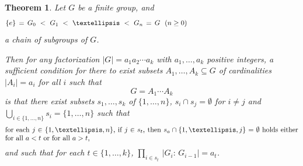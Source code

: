 \documentclass[10pt,a4paper]{amsart}
\newtheorem{theorem}{Theorem}[section]
\begin{document}
\begin{theorem}\label{thm2}
Let $G$ be a finite group, and
%
\begin{equation}\begin{minipage}[c]{35pc}\label{d.G0Gn}
$\{e\}\,=\,G_0\ <\ G_1\ <\ \dots\ <\ G_n\,=\,G$ \ $(n\geq 0)$
\end{minipage}\end{equation}
%
a chain of subgroups of $G$.

Then for any factorization $|G| = a_1 a_2 \cdots a_k$ with $a_1, \dots, a_k$ positive integers, a {\em sufficient} condition for there
to exist subsets $A_1,\dots,A_k \subseteq G$ of cardinalities $|A_i| = a_i$ for all $i$ such that $$G = A_1 \cdots A_k$$
is that there exist subsets $s_1 , \dots, s_k$ of $\{1,\dots,n\}$, $s_i \cap s_j = \emptyset$ for $i \neq j$ and $\bigcup_{i \in \{1,\dots,n\}} s_i = \{1,\dots,n\}$ such that 
%
\begin{equation*}\begin{minipage}[c]{35pc}
for each $j \in \{1,\dots,n\}$, if $j \in s_t$, then $s_a \cap \{1,\dots,j\} = \emptyset$ holds either for all $a < t$ or for all $a > t$,
\end{minipage}\end{equation*}
%
and such that for each $t \in \{1,\dots,k\}$, $\prod_{i\in s_t}\,|G_i:\,G_{i-1}| = a_t$.
\end{theorem}
\end{document}
